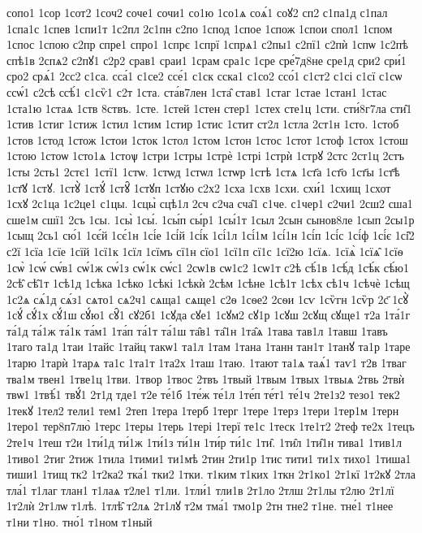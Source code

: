 {сопо1
1сор
1сот2
1соч2
соче1
сочи1
со1ю
1со1ѧ
соѧ́1
соꙋ2
сп2
с1па1д
с1пал
1спа1с
1спев
1спи1т
1с2пл
2с1пн
с2по
1спод
1спое
1спож
1спои
спол1
1спом
1спос
1спою
с2пр
спре1
спро1
1спрє
1спрї
1спрѧ1
с2пы1
с2пї1
с2пѝ
1спѡ
1с2пѣ
спѣ1в
2спѧ2
с2пꙋ1
с2р2
срав1
сраи1
1срам
сра1с
1сре
сре́7д8не
сре1д
сри2
сри́1
сро2
срѧ́1
2сс2
с1са.
сса́1
с1се2
ссе́1
с1ск
сска1
с1со2
ссо́1
с1ст2
с1сі
с1сї
с1сѡ
ссѡ́1
с2сѣ
ссѣ́1
с1сѷ1
с2т
1ста.
ста́в7лен
1ста̑
став1
1стаг
1стае
1стан1
1стас
1ста1ю
1стаѧ
1ств
8ствъ.
1сте.
1стей
1стен
стер1
1стех
сте1ц
1сти.
сти́8г7ла
сти̑1
1стив
1стиг
1стиж
1стил
1стим
1стир
1стис
1стит
ст2л
1стла
2ст1н
1сто.
1стоб
1стов
1стод
1стож
1стои
1сток
1стол
1стом
1стон
1стос
1стот
1стоф
1стох
1стош
1стою
1стоѡ
1сто1ѧ
1стоѱ
1стри
1стры
1стрѐ
1стрі
1стрѝ
1стрꙋ
2стс
2ст1ц
2стъ
1сты
2сть1
2стє1
1стї1
1стѡ.
1стѡд
1стѡл
1стѡр
1стѣ
1стѧ
1ст҃а
1ст҃о
1ст҃ы
1ст҃ѣ
1ст҃ꙋ
1стꙋ.
1стꙋ̀
1стꙋ́
1стꙋ̑
1стꙋп
1стꙋю
с2х2
1сха
1схв
1схи.
схи́1
1схищ
1схот
1схꙋ
2с1ца
1с2це1
с1цы.
1сцы̀
сцѣ1л
2сч
с2ча
сча̑1
с1че.
с1чер1
с2чи1
2сш2
сша1
сше1м
сшї1
2съ
1сы.
1сы̀
1сы́.
1сы́п
сы́р1
1сы́1т
1сыл
2сын
сынов8ле
1сып
2сы1р
1сыщ
2сь1
сю́1
1сє́й
1сє́1н
1сі́е
1сі́й
1сі́к
1сі́1л
1сі́1м
1сі́1н
1сі́п
1сі́с
1сі́ф
1сі́є
1сі̑2
с2ї
1сїа
1сїе
1сїй
1сї1к
1сїл
1сїмъ
сї1н
сїо1
1сї1п
сї1с
1сї2ю
1сїѧ.
1сїѧ̀
1сїѧ̑
1сїѳ
1сѡ̀
1сѡ́
сѡ́в1
сѡ́1ж
сѡ́1з
сѡ́1к
сѡ́с1
2сѡ1в
сѡ1с2
1сѡ1т
с2ѣ
сѣ́1в
1сѣ́д
1сѣ́к
сѣ́ю1
2сѣ̑
сѣ̑1т
1сѣ1д
1сѣка
1сѣко
1сѣкі
1сѣкѝ
2сѣм
1сѣне
1сѣ1т
1сѣх
сѣ1ч
1сѣчѐ
1сѣщ
1с2ѧ
сѧ́1д
сѧ́з1
сѧто1
сѧ2ч1
сѧща1
сѧще1
с2ѳ
1сѳе2
2сѳи
1сѵ
1сѷгн
1сѷр
2с҃
1сꙋ̀
1сꙋ́
сꙋ́1х
сꙋ́1ш
сꙋ́ю1
сꙋ̑1
сꙋ2б1
1сꙋда
сꙋе1
1сꙋм2
сꙋ1р
1сꙋш
2сꙋщ
сꙋще1
т2а
1та́1г
та́1д
та́1ж
та́1к
та́м1
1та́п
та́1т
та́1ш
та̑в1
та̑1н
1та̑ѧ
1тава
тав1л
1тавш
1тавъ
1таго
та1д
1таи
1тайс
1тайц
такѡ1
та1л
1там
1тана
1танн
тан1т
1танꙋ
та1р
1таре
1тарю
1тарѝ
1тарѧ
та1с
1та1т
1та2х
1таш
1таю.
1тают
та1ѧ
таѧ́1
таѵ1
т2в
1тваг
тва1м
твен1
1тве1ц
1тви.
1твор
1твос
2твъ
1твый
1твым
1твых
1твыѧ
2твь
2твѝ
твѡ1
1твѣ́1
твꙋ́1
2т1д
тде1
т2е
те́1б
1те́ж
те́1л
1те́п
те́т1
те́1ч
2те1з2
тезо1
тек2
1текꙋ
1тел2
тели1
тем1
2теп
1тера
1терб
1терг
1тере
1терз
1тери
1тер1м
1терн
1теро1
тер8п7лю̀
1терс
1теры
1терь
1тері
1терї
те1с
1теск
1те1т2
2теф
те2х
1тецъ
2те1ч
1теш
т2и
1ти́1д
ти́1ж
1ти́1з
ти́1н
1ти́р
ти́1с
1ти̑.
1ти̑л
1ти̑1н
тива1
1тив1л
1тиво1
2тиг
2тиж
1тила
1тими1
ти1мѣ
2тин
2ти1р
1тис
тити1
ти1х
тихо1
1тиша1
тиши1
1тищ
тк2
1т2ка2
тка́1
тки2
1тки.
т1ким
т1ких
1ткн
2т1ко1
2т1кї
1т2кꙋ
2тла
тла́1
т1лаг
тлан1
т1лаѧ
т2ле1
т1ли.
1тли́1
тли1в
2т1ло
2тлш
2т1лы
т2лю
2т1лї
1т2лѝ
2т1лѡ
т1лѣ.
1тлѣ̑
т2лѧ
2т1лꙋ
т2м
тма́1
тмо1р
2тн
тне2
т1не.
тне́1
т1нее
т1ни
т1но.
тно́1
т1ном
т1ный
}
